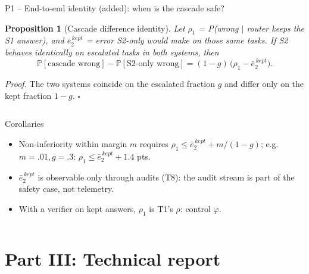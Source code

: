 \documentclass[aspectratio=169,10pt]{beamer}
\renewcommand{\Pr}{\mathbb{P}}
\newtheorem{proposition}{Proposition}
\begin{document}
\begin{frame}{P1 -- End-to-end identity (added): when is the cascade safe?}
\begin{proposition}[Cascade difference identity]\small
Let $\rho_1$ = P(wrong $\mid$ router keeps the S1 answer), and $\bar e_2^{\,kept}$ = error S2-only would make on those same tasks. If S2 behaves identically on escalated tasks in both systems, then
$$\Pr[\text{cascade wrong}]-\Pr[\text{S2-only wrong}]=(1-g)\,\bigl(\rho_1-\bar e_2^{\,kept}\bigr).$$
\end{proposition}
\vspace{-2pt}
\small\textit{Proof.} The two systems coincide on the escalated fraction $g$ and differ only on the kept fraction $1-g$. \hfill$\square$

\begin{columns}[T]
\begin{block}{Corollaries}
\scriptsize
\begin{itemize}\setlength\itemsep{1pt}
\item Non-inferiority within margin $m$ requires $\rho_1\le\bar e_2^{\,kept}+m/(1-g)$; e.g.\ $m{=}.01,g{=}.3$: $\rho_1\le\bar e_2^{\,kept}+1.4$ pts.
\item $\bar e_2^{\,kept}$ is observable only through audits (T8): the audit stream is part of the safety case, not telemetry.
\item With a verifier on kept answers, $\rho_1$ is T1's $\rho$: control $\varphi$.
\end{itemize}
\end{block}
\centering
{}
\end{columns}
\end{frame}

\section{Part III: Technical report}
\end{document}
